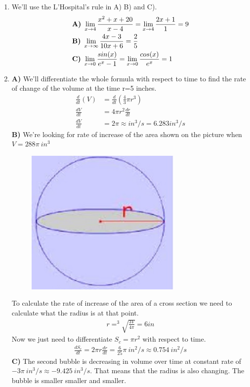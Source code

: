 \documentclass[13pt, a4paper, twoside]{article}
\begin{document}
\begin{enumerate}
\large \onehalfspacing
\item We'll use the L'Hospital's rule in A) B) and C).
\begin{align*}
   &\text{\textbf{A)} } \lim_{x\to 4} \frac{x^2 + x + 20}{x -4} = 
   \lim_{x \to 4} \frac{2x + 1}{1} = 9\\
   &\text{\textbf{B)} } \lim_{x \to \infty} \frac{4x - 3}{10x + 6} = \frac{2}{5}\\
   &\text{\textbf{C)} } \lim_{x \to 0} \frac{sin(x)}{e^x-1} = \lim_{x\to 0 } \frac{cos(x)}{e^x} = 1
\end{align*}

\item \textbf{A)} We'll differentiate the whole formula with respect to time to 
find the rate of change of the volume at the time r=5 inches.
\begin{align*}
    \frac{d}{dt}(V) &= \frac{d}{dt}(\frac{4}{3} \pi r^3) \\
    \frac{dV}{dt} &= 4 \pi r^2 \frac{dr}{dt} \\
    \frac{dV}{dt} &= 2\pi \approx in^3/s = 6.283 in^3/s  
\end{align*}
\textbf{B)} We're looking for rate of increase of the area shown on the picture when 
$V=288\pi\: in^3$
\begin{figure}[H]
    \centering
    \includegraphics[width=3in]{crosssection_sphere.jpeg}
\end{figure}

To calculate the rate of increase of the area of a cross section we need to calculate
what the radius is at that point.
\begin{align*}
    r = ^3\sqrt{\frac{3V}{4\pi}} = 6in
\end{align*}
Now we just need to differentiate $S_c = \pi r^2$ with respect to time.
\begin{align*}
    \frac{dS_c}{dt} = 2\pi r\frac{dr}{dt} = \frac{6}{25} \pi \: in^2/s \approx 0.754 \: in^2/s
\end{align*}
\textbf{C)} The second bubble is decreasing in volume over time at constant rate of $-3\pi \: in^3/s \approx -9.425 \: in^3/s$.
That means that the radius is also changing. The bubble is smaller smaller and smaller.


\end{enumerate}
\end{document}

